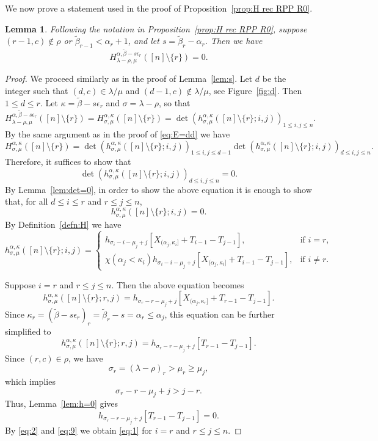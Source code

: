 \documentclass[12pt]{amsart}
\numberwithin{equation}{section}
\newtheorem{lem}[thm]{Lemma}
\theoremstyle{definition}
\newcommand\wb{\widetilde{\beta}}
\newcommand\lm{{\lambda/\mu}}
\begin{document}
We now prove a statement used in the proof of Proposition~\ref{prop:H rec RPP
  R0}.

\begin{lem}\label{lem:ss}
  Following the notation in Proposition~\ref{prop:H rec RPP R0}, suppose
  $(r-1,c)\notin\rho$ or $\wb_{r-1}<\alpha_r+1$, and let $s=\wb_r-\alpha_r$.
  Then we have
  \begin{equation}\label{eq:h0}
H^{\alpha,\wb-s\epsilon_r}_{\lambda-\rho,\mu}([n]\setminus\{r\})= 0.
  \end{equation}
\end{lem}
\begin{proof}
  We proceed similarly as in the proof of Lemma~\ref{lem:s}. Let $d$ be the
  integer such that $(d,c)\in\lm$ and $(d-1,c)\notin\lm$, see
  Figure~\ref{fig:d}. Then $1\le d\le r$. Let $\kappa=\wb-s\epsilon_r$ and
  $\sigma =\lambda-\rho$, so that
\[
H^{\alpha,\wb-s\epsilon_r}_{\lambda-\rho,\mu}([n]\setminus\{r\})
  = H_{\sigma,\mu}^{\alpha,\kappa}([n]\setminus\{r\})
=  \det(h_{\sigma,\mu}^{\alpha,\kappa}([n]\setminus\{r\};i,j))_{1\le i,j\le n}.
\]
By the same argument as in the proof of \eqref{eq:E=dd} we have
\[
  H_{\sigma,\mu}^{\alpha,\kappa}([n]\setminus\{r\})
  =  \det(h_{\sigma,\mu}^{\alpha,\kappa}([n]\setminus\{r\};i,j))_{1\le i,j\le d-1}
  \det(h_{\sigma,\mu}^{\alpha,\kappa}([n]\setminus\{r\};i,j))_{d\le i,j\le n}.
\]
Therefore, it suffices to show that
\[
\det(h_{\sigma,\mu}^{\alpha,\kappa}([n]\setminus\{r\};i,j))_{d\le i,j\le n} = 0.
\]
By Lemma~\ref{lem:det=0}, in order to show the above equation it is enough to
show that, for all $d\le i\le r$ and $r\le j\le n$,
\begin{equation}
  \label{eq:1}
 h_{\sigma,\mu}^{\alpha,\kappa}([n]\setminus\{r\};i,j) = 0.
\end{equation}
By Definition~\ref{defn:H} we have
    \[
      h^{\alpha,\kappa}_{\sigma,\mu}([n]\setminus\{r\};i,j)=
      \begin{cases}
      h_{\sigma_i-i-\mu_j+j}[X_{(\alpha_j,\kappa_i]} + T_{i-1}-T_{j-1}],
      & \mbox{if $i= r$},\\
      \chi(\alpha_j<\kappa_i) h_{\sigma_i-i-\mu_j+j}[X_{(\alpha_j,\kappa_i]} + T_{i-1}-T_{j-1}],
      & \mbox{if $i\ne r$}.
      \end{cases}
  \]

  Suppose $i=r$ and $r\le j\le n$. Then the above equation becomes
\[
      h^{\alpha,\kappa}_{\sigma,\mu}([n]\setminus\{r\};r,j)=
      h_{\sigma_r-r-\mu_j+j}[X_{(\alpha_j,\kappa_r]} + T_{r-1}-T_{j-1}].
\]
Since $\kappa_r = (\wb-s\epsilon_r)_r = \wb_r-s = \alpha_r \le \alpha_j$,
this equation can be further simplified to
\begin{equation}
  \label{eq:2}
      h^{\alpha,\kappa}_{\sigma,\mu}([n]\setminus\{r\};r,j)=
      h_{\sigma_r-r-\mu_j+j}[T_{r-1}-T_{j-1}].
\end{equation}
Since $(r,c)\in\rho$, we have
\[
\sigma_r=(\lambda-\rho)_r>\mu_r\ge\mu_j,
\]
which implies
\[
\sigma_r-r-\mu_j+j > j-r.
\]
Thus, Lemma~\ref{lem:h=0} gives
\begin{equation}
  \label{eq:9}
      h_{\sigma_r-r-\mu_j+j}[T_{r-1}-T_{j-1}]=0.
\end{equation}
By \eqref{eq:2} and \eqref{eq:9} we obtain \eqref{eq:1} for $i=r$ and $r\le j\le n$.


\end{proof}
\end{document}
